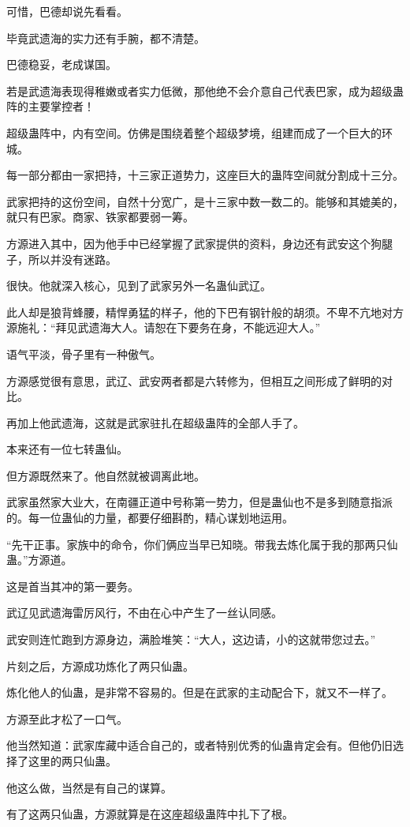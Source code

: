 \begin{this_body}
可惜，巴德却说先看看。

毕竟武遗海的实力还有手腕，都不清楚。

巴德稳妥，老成谋国。

若是武遗海表现得稚嫩或者实力低微，那他绝不会介意自己代表巴家，成为超级蛊阵的主要掌控者！

超级蛊阵中，内有空间。仿佛是围绕着整个超级梦境，组建而成了一个巨大的环城。

每一部分都由一家把持，十三家正道势力，这座巨大的蛊阵空间就分割成十三分。

武家把持的这份空间，自然十分宽广，是十三家中数一数二的。能够和其媲美的，就只有巴家。商家、铁家都要弱一筹。

方源进入其中，因为他手中已经掌握了武家提供的资料，身边还有武安这个狗腿子，所以并没有迷路。

很快。他就深入核心，见到了武家另外一名蛊仙武辽。

此人却是狼背蜂腰，精悍勇猛的样子，他的下巴有钢针般的胡须。不卑不亢地对方源施礼：“拜见武遗海大人。请恕在下要务在身，不能远迎大人。”

语气平淡，骨子里有一种傲气。

方源感觉很有意思，武辽、武安两者都是六转修为，但相互之间形成了鲜明的对比。

再加上他武遗海，这就是武家驻扎在超级蛊阵的全部人手了。

本来还有一位七转蛊仙。

但方源既然来了。他自然就被调离此地。

武家虽然家大业大，在南疆正道中号称第一势力，但是蛊仙也不是多到随意指派的。每一位蛊仙的力量，都要仔细斟酌，精心谋划地运用。

“先干正事。家族中的命令，你们俩应当早已知晓。带我去炼化属于我的那两只仙蛊。”方源道。

这是首当其冲的第一要务。

武辽见武遗海雷厉风行，不由在心中产生了一丝认同感。

武安则连忙跑到方源身边，满脸堆笑：“大人，这边请，小的这就带您过去。”

片刻之后，方源成功炼化了两只仙蛊。

炼化他人的仙蛊，是非常不容易的。但是在武家的主动配合下，就又不一样了。

方源至此才松了一口气。

他当然知道：武家库藏中适合自己的，或者特别优秀的仙蛊肯定会有。但他仍旧选择了这里的两只仙蛊。

他这么做，当然是有自己的谋算。

有了这两只仙蛊，方源就算是在这座超级蛊阵中扎下了根。


\end{this_body}
